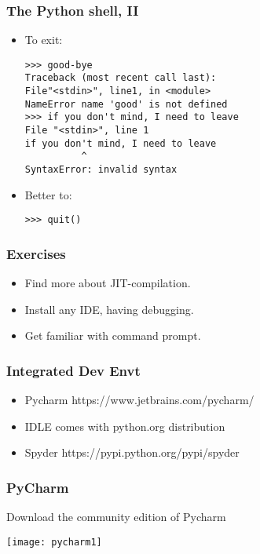 \begin{frame}[fragile]\frametitle{The Python shell, II}
\begin{itemize}
\item To exit:
	\begin{lstlisting}
>>> good-bye
Traceback (most recent call last):
File"<stdin>", line1, in <module>
NameError name 'good' is not defined
>>> if you don't mind, I need to leave 
File "<stdin>", line 1
if you don't mind, I need to leave
          ^
SyntaxError: invalid syntax
	\end{lstlisting}

\item Better to: \\ 
\begin{lstlisting}
>>> quit()
\end{lstlisting}
\end{itemize}
\end{frame}

\begin{frame}[fragile]\frametitle{Exercises}
\begin{itemize}
\item Find more about JIT-compilation.
\item Install any IDE, having debugging.
\item Get familiar with command prompt.
\end{itemize}
\end{frame}

\begin{frame}[fragile]\frametitle{Integrated Dev Envt}
  \begin{itemize}
  \item Pycharm https://www.jetbrains.com/pycharm/
  \item IDLE comes with python.org distribution
  \item Spyder https://pypi.python.org/pypi/spyder
  \end{itemize}
\end{frame}

\begin{frame}[fragile]\frametitle{PyCharm}
Download the community edition of Pycharm
\begin{center}
\texttt{[image: pycharm1]}
\end{center}
\end{frame}

